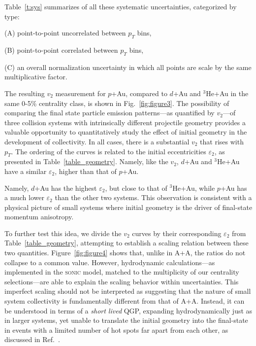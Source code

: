 \documentclass[%
reprint,
showpacs,preprintnumbers,
 amsmath,amssymb,
 aps,
]{revtex4-1}
\newcommand{\pt}{\mbox{$p_T$}\xspace}
\newcommand{\dau}{\mbox{$d$+Au}\xspace}
\newcommand{\pau}{\mbox{$p$+Au}\xspace}
\newcommand{\hau}{\mbox{$^3\text{He}$+Au}\xspace}
\begin{document}
Table~\ref{t:sys} summarizes of all these systematic
uncertainties, categorized by type:

(A) point-to-point uncorrelated between $p_T$ bins,

(B) point-to-point correlated between $p_T$ bins,

(C) an overall normalization uncertainty in which all points are scale by the same multiplicative factor.

The resulting $v_2$ measurement for \pau, compared to \dau and \hau in the same 0-5\% centrality class, is shown in Fig.~\ref{fig:figure3}. The possibility of comparing the final state particle emission patterns---as quantified by $v_2$---of three collision systems with intrinsically different projectile geometry provides a valuable opportunity to quantitatively study the effect of initial geometry in the development of collectivity.  In all cases, there is a substantial $v_2$ that rises with \pt. The ordering of the curves is related to the initial eccentricities $\varepsilon_2$, as presented in Table~\ref{table_geometry}. Namely, like the $v_2$, \dau and \hau have a similar $\varepsilon_2$, higher than that of \pau.

Namely, \dau has the highest $\varepsilon_2$, but close to that of \hau, while \pau has a much lower $\varepsilon_2$ than the other two systems. This observation is consistent with a physical picture of small systems where initial geometry is the driver of final-state momentum anisotropy.

To further test this idea, we divide the $v_2$ curves by their corresponding $\varepsilon_2$ from Table~\ref{table_geometry}, attempting to establish a scaling relation between these two quantities. Figure~\ref{fig:figure4} shows that, unlike in A+A, the ratios do not collapse to a common value. However, hydrodynamic calculations---as implemented in the \textsc{sonic} model, matched to the multiplicity of our centrality selections---are able to explain the scaling behavior within uncertainties. This imperfect scaling should not be interpreted as suggesting that the nature of small system collectivity is fundamentally different from that of A+A. Instead, it can be understood in terms of a \emph{short lived} QGP, expanding hydrodynamically just as in larger systems, yet unable to translate the initial geometry into the final-state in events with a limited number of hot spots far apart from each other, as discussed in Ref.~\cite{nagle_exploiting_2013}.
\end{document}
